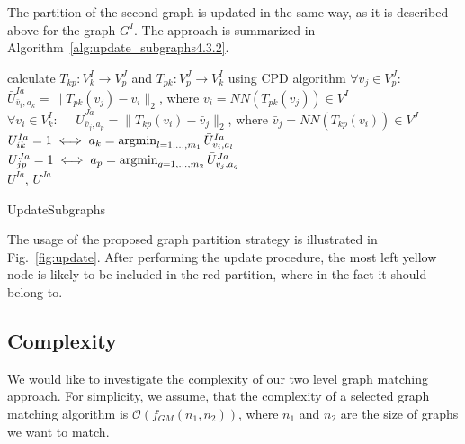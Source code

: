 The partition of the second graph is updated in the same way, as it is described above for the graph $G^I$. The approach is summarized in Algorithm~\ref{alg:update_subgraphs4.3.2}.

\begin{algorithm}[h]
	{
		calculate $T_{kp}:V^I_k\rightarrow V^J_p$ and $T_{pk}:V^J_p\rightarrow V^I_k$ using CPD algorithm
	}
	{
		$\forall v_j\in V^J_p:\quad$ $\bar{U}^{Ia}_{\bar{v}_i,a_k}=\|T_{pk}(v_j)-\bar{v}_i\|_2$, where $\bar{v}_i=NN(T_{pk}(v_j))\in V^I$\\
		$\forall v_i\in V^I_k:\quad$ $\bar{U}^{Ja}_{\bar{v}_j,a_p}=\|T_{kp}(v_i)-\bar{v}_j\|_2$, where $\bar{v}_j=NN(T_{kp}(v_i))\in V^J$
	}
	$U^{Ia}_{ik}=1 \iff a_k=\mathop{\rm argmin}_{l=1,\dots,m_1}^{}{\bar{U}^{Ia}_{v_i,a_l}}$\\
	$U^{Ja}_{jp}=1 \iff a_p=\mathop{\rm argmin}_{q=1,\dots,m_2}^{}{\bar{U}^{Ja}_{v_j,a_q}}$\\
	\Return $U^{Ia}$, $U^{Ja}$
	
	\caption{UpdateSubgraphs}    \label{alg:update_subgraphs4.3.2}
\end{algorithm}

The usage of the proposed graph partition strategy is illustrated in Fig.~\ref{fig:update}. After performing the update procedure, the most left yellow node is likely to be included in the red partition, where in the fact it should belong to.
\FloatBarrier
\subsection{Complexity}
We would like to investigate the  complexity of our two level graph matching approach. For simplicity, we assume, that the complexity of a selected graph matching algorithm is $\mathcal{O}(f_{GM}(n_1,n_2))$, where $n_1$ and $n_2$ are the size of graphs we want to match.

